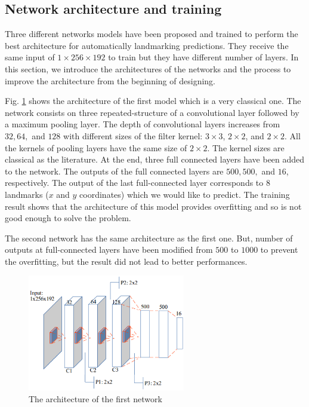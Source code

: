 \documentclass{article} %
\begin{document}
\begin{multicols}{2}
\subsection{Network architecture and training}
Three different networks models have been proposed and trained to perform the best architecture for automatically landmarking predictions. They receive the same input of $1 \times 256 \times 192$ to train but they have different number of layers. In this section, we introduce the architectures of the networks and the process to improve the architecture from the beginning of designing.

Fig. \ref{figarch0} shows the architecture of the first model which is a very classical one. The network consists on three repeated-structure of a convolutional layer followed by a maximum pooling layer. The depth of convolutional layers increases from $32, 64,$ and $128$ with different sizes of the filter kernel: $3 \times 3$, $2 \times 2$, and $2 \times 2$. All the kernels of pooling layers have the same size of $2 \times 2$. The kernel sizes are classical as the literature. At the end, three full connected layers have been added to the network. The outputs of the full connected layers are $500, 500,$ and $16$, respectively. The output of the last full-connected layer corresponds to 8 landmarks ($x$ and $y$ coordinates) which we would like to predict. The training result shows that the architecture of this model provides overfitting and so is not good enough to solve the problem.

The second network has the same architecture as the first one. But, number of outputs at full-connected layers have been modified from $500$ to $1000$ to prevent the overfitting, but the result did not lead to better performances. 

\begin{figure}[H]
	\centerline{\includegraphics[height=2in]{images/architecture1.eps}}
	\caption{The architecture of the first network}
	\label{figarch0}
\end{figure}


\end{multicols}
\end{document}
